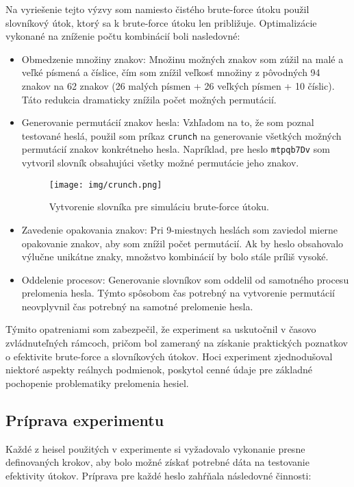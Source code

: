 \documentclass[12pt, twoside]{book}
\begin{document}
Na vyriešenie tejto výzvy som namiesto čistého brute-force útoku použil slovníkový útok, ktorý sa k brute-force útoku len približuje. Optimalizácie vykonané na zníženie počtu kombinácií boli nasledovné:

\begin{itemize} 
\item Obmedzenie množiny znakov: Množinu možných znakov som zúžil na malé a veľké písmená a číslice, čím som znížil veľkosť množiny z pôvodných 94 znakov na 62 znakov (26 malých písmen + 26 veľkých písmen + 10 číslic). Táto redukcia dramaticky znížila počet možných permutácií. 
\item Generovanie permutácií znakov hesla: Vzhľadom na to, že som poznal testované heslá, použil som príkaz \texttt{crunch} na generovanie všetkých možných permutácií znakov konkrétneho hesla. Napríklad, pre heslo \texttt{mtpqb7Dv} som vytvoril slovník obsahujúci všetky možné permutácie jeho znakov. 

\begin{figure}[H] 
    \centering
    \texttt{[image: img/crunch.png]}
    \caption{Vytvorenie slovníka pre simuláciu brute-force útoku.}
    \label{fig:crunch}
\end{figure}

\item Zavedenie opakovania znakov: Pri 9-miestnych heslách som zaviedol mierne opakovanie znakov, aby som znížil počet permutácií. Ak by heslo obsahovalo výlučne unikátne znaky, množstvo kombinácií by bolo stále príliš vysoké.
\item Oddelenie procesov: Generovanie slovníkov som oddelil od samotného procesu prelomenia hesla. Týmto spôsobom čas potrebný na vytvorenie permutácií neovplyvnil čas potrebný na samotné prelomenie hesla. 
\end{itemize}

Týmito opatreniami som zabezpečil, že experiment sa uskutočnil v časovo zvládnuteľných rámcoch, pričom bol zameraný na získanie praktických poznatkov o efektivite brute-force a slovníkových útokov. Hoci experiment zjednodušoval niektoré aspekty reálnych podmienok, poskytol cenné údaje pre základné pochopenie problematiky prelomenia hesiel.


\subsection{Príprava experimentu}
Každé z heisel použitých v experimente si vyžadovalo vykonanie presne definovaných krokov, aby bolo možné získať potrebné dáta na testovanie efektivity útokov. Príprava pre každé heslo zahŕňala následovné činnosti:
\end{document}
